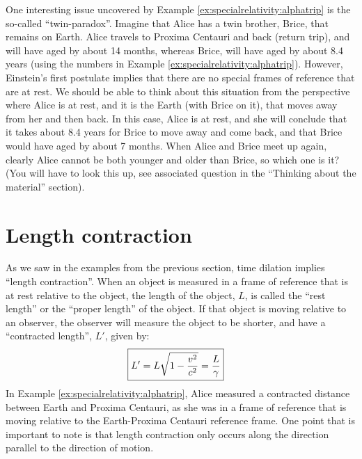 One interesting issue uncovered by Example \ref{ex:specialrelativity:alphatrip} is the so-called ``twin-paradox''. Imagine that Alice has a twin brother, Brice, that remains on Earth. Alice travels to Proxima Centauri and back (return trip), and will have aged by about 14 months, whereas Brice, will have aged by about 8.4 years (using the numbers in Example \ref{ex:specialrelativity:alphatrip}). However, Einstein's first postulate implies that there are no special frames of reference that are at rest. We should be able to think about this situation from the perspective where Alice is at rest, and it is the Earth (with Brice on it), that moves away from her and then back. In this case, Alice is at rest, and she will conclude that it takes about 8.4 years for Brice to move away and come back, and that Brice would have aged by about 7 months. When Alice and Brice meet up again, clearly Alice cannot be both younger and older than Brice, so which one is it? (You will have to look this up, see associated question in the ``Thinking about the material'' section).

\section{Length contraction}
As we saw in the examples from the previous section, time dilation implies ``length contraction''. When an object is measured in a frame of reference that is at rest relative to the object, the length of the object, $L$, is called the ``rest length'' or the ``proper length'' of the object. If that object is moving relative to an observer, the observer will measure the object to be shorter, and have a ``contracted length'', $L'$, given by:
\begin{align*}
\Aboxed{L'=L\sqrt{1-\frac{v^2}{c^2}} =\frac{L}{\gamma}}
\end{align*}
In Example \ref{ex:specialrelativity:alphatrip}, Alice measured a contracted distance between Earth and Proxima Centauri, as she was in a frame of reference that is moving relative to the Earth-Proxima Centauri reference frame. One point that is important to note is that length contraction only occurs along the direction parallel to the direction of motion.

